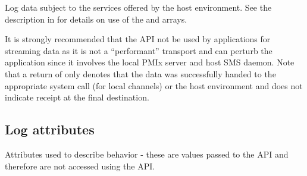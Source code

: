 \optattrend

\descr

Log data subject to the services offered by the host environment. See the description in  for details on use of the  and  arrays.

\adviceuserstart
It is strongly recommended that the  API not be used by applications for streaming data as it is not a ``performant'' transport and can perturb the application since it involves the local \ac{PMIx} server and host \ac{SMS} daemon. Note that a return of  only denotes that the data was successfully handed to the appropriate system call (for local channels) or the host environment and does not indicate receipt at the final destination.
\adviceuserend


\subsection{Log attributes}
\label{api:struct:attributes:log}

Attributes used to describe  behavior - these are values passed to the  \ac{API} and therefore are not accessed using the  \ac{API}.

